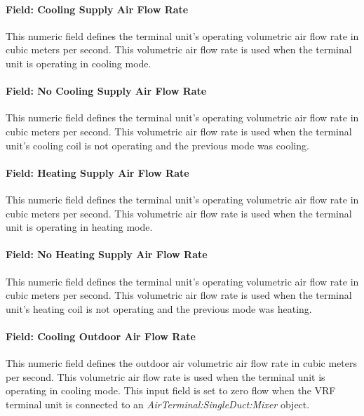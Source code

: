 \paragraph{Field: Cooling Supply Air Flow Rate}\label{field-cooling-supply-air-flow-rate-3-001}

This numeric field defines the terminal unit's operating volumetric air flow rate in cubic meters per second. This volumetric air flow rate is used when the terminal unit is operating in cooling mode.

\paragraph{Field: No Cooling Supply Air Flow Rate}\label{field-no-cooling-supply-air-flow-rate-000}

This numeric field defines the terminal unit's operating volumetric air flow rate in cubic meters per second. This volumetric air flow rate is used when the terminal unit's cooling coil is not operating and the previous mode was cooling.

\paragraph{Field: Heating Supply Air Flow Rate}\label{field-heating-supply-air-flow-rate-3-001}

This numeric field defines the terminal unit's operating volumetric air flow rate in cubic meters per second. This volumetric air flow rate is used when the terminal unit is operating in heating mode.

\paragraph{Field: No Heating Supply Air Flow Rate}\label{field-no-heating-supply-air-flow-rate-000}

This numeric field defines the terminal unit's operating volumetric air flow rate in cubic meters per second. This volumetric air flow rate is used when the terminal unit's heating coil is not operating and the previous mode was heating.

\paragraph{Field: Cooling Outdoor Air Flow Rate}\label{field-cooling-outdoor-air-flow-rate-3}

This numeric field defines the outdoor air volumetric air flow rate in cubic meters per second. This volumetric air flow rate is used when the terminal unit is operating in cooling mode. This input field is set to zero flow when the VRF terminal unit is connected to an \textit{AirTerminal:SingleDuct:Mixer} object.

